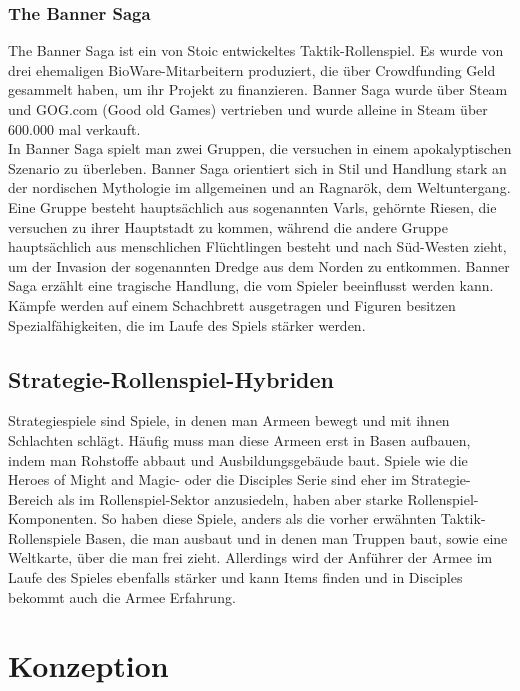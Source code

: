 \documentclass[extern,palatino]{cgBA}
\begin{document}
	\subsubsection{The Banner Saga}
	The Banner Saga ist ein von Stoic entwickeltes Taktik-Rollenspiel. Es wurde von drei ehemaligen BioWare-Mitarbeitern produziert, die über Crowdfunding Geld gesammelt haben, um ihr Projekt zu finanzieren. Banner Saga wurde über Steam und GOG.com (Good old Games) vertrieben und wurde alleine in Steam über 600.000 mal verkauft.
	\\In Banner Saga spielt man zwei Gruppen, die versuchen in einem apokalyptischen Szenario zu überleben. Banner Saga orientiert sich in Stil und Handlung stark an der nordischen Mythologie im allgemeinen und an Ragnarök, dem Weltuntergang. Eine Gruppe besteht hauptsächlich aus sogenannten Varls, gehörnte Riesen, die versuchen zu ihrer Hauptstadt zu kommen, während die andere Gruppe hauptsächlich aus menschlichen Flüchtlingen besteht und nach Süd-Westen zieht, um der Invasion der sogenannten Dredge aus dem Norden zu entkommen.
	Banner Saga erzählt eine tragische Handlung, die vom Spieler beeinflusst werden kann. Kämpfe werden auf einem Schachbrett ausgetragen und Figuren besitzen Spezialfähigkeiten, die im Laufe des Spiels stärker werden. 
	\subsection{Strategie-Rollenspiel-Hybriden} Strategiespiele sind Spiele, in denen man Armeen bewegt und mit ihnen Schlachten schlägt. Häufig muss man diese Armeen erst in Basen aufbauen, indem man Rohstoffe abbaut und Ausbildungsgebäude baut. Spiele wie die Heroes of Might and Magic- oder die Disciples Serie sind eher im Strategie-Bereich als im Rollenspiel-Sektor anzusiedeln, haben aber starke Rollenspiel-Komponenten. So haben diese Spiele, anders als die vorher erwähnten Taktik-Rollenspiele Basen, die man ausbaut und in denen man Truppen baut, sowie eine Weltkarte, über die man frei zieht. Allerdings wird der Anführer der Armee im Laufe des Spieles ebenfalls stärker und kann Items finden und in Disciples bekommt auch die Armee Erfahrung.
	
	
	\newpage
	\section {Konzeption}
\end{document}
